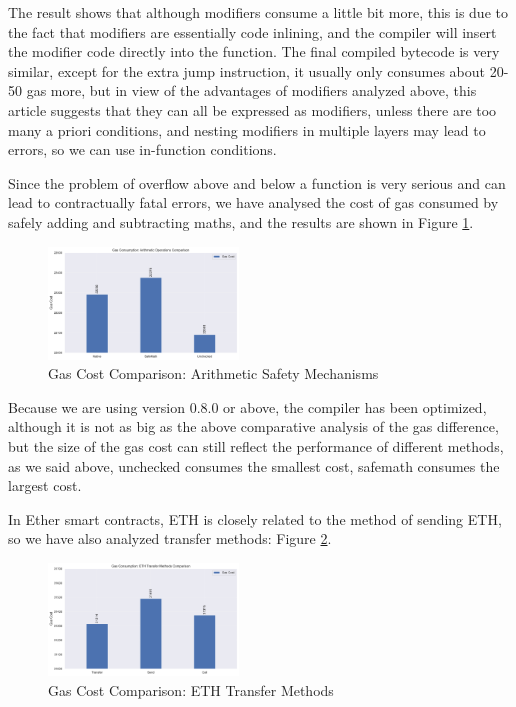 \documentclass[conference]{IEEEtran}
\begin{document}
The result shows that although modifiers consume a little bit more, this is due to the fact that modifiers are essentially code inlining, and the compiler will insert the modifier code directly into the function. The final compiled bytecode is very similar, except for the extra jump instruction, it usually only consumes about 20-50 gas more, but in view of the advantages of modifiers analyzed above, this article suggests that they can all be expressed as modifiers, unless there are too many a priori conditions, and nesting modifiers in multiple layers may lead to errors, so we can use in-function conditions.

\vspace{1em}
Since the problem of overflow above and below a function is very serious and can lead to contractually fatal errors, we have analysed the cost of gas consumed by safely adding and subtracting maths, and the results are shown in Figure \ref{fig:arithmetic-comparison}.

\begin{figure}[htbp]
    \centering
    \includegraphics[width=0.45\textwidth]{arithmetic_comparison.pdf}
    \caption{Gas Cost Comparison: Arithmetic Safety Mechanisms}
    \label{fig:arithmetic-comparison}
\end{figure}

Because we are using version 0.8.0 or above, the compiler has been optimized, although it is not as big as the above comparative analysis of the gas difference, but the size of the gas cost can still reflect the performance of different methods, as we said above, unchecked consumes the smallest cost, safemath consumes the largest cost. 

\vspace{1em}
In Ether smart contracts, ETH is closely related to the method of sending ETH, so we have also analyzed transfer methods: Figure \ref{fig:transfer-comparison}.

\begin{figure}[htbp]
    \centering
    \includegraphics[width=0.45\textwidth]{transfer_comparison.pdf}
    \caption{Gas Cost Comparison: ETH Transfer Methods}
    \label{fig:transfer-comparison}
\end{figure}
\end{document}
